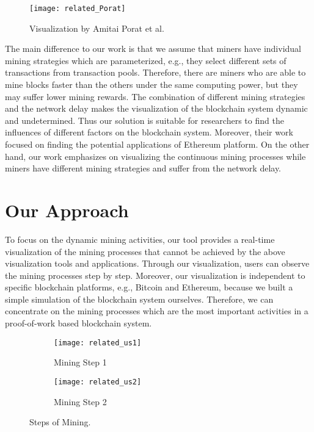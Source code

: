 \begin{figure}[htb]
    \centering
    \texttt{[image: related\_Porat]}
    \caption{Visualization by Amitai Porat et al.}
    \label{fig:visualization by amitai porat et al}
\end{figure}

The main difference to our work is that we assume that miners have individual mining strategies which are parameterized, e.g., they select different sets of transactions from transaction pools. Therefore, there are miners who are able to mine blocks faster than the others under the same computing power, but they may suffer lower mining rewards. The combination of different mining strategies and the network delay makes the visualization of the blockchain system dynamic and undetermined. Thus our solution is suitable for researchers to find the influences of different factors on the blockchain system. Moreover, their work focused on finding the potential applications of Ethereum platform. On the other hand, our work emphasizes on visualizing the continuous mining processes while miners have different mining strategies and suffer from the network delay. 

\section{Our Approach}

To focus on the dynamic mining activities, our tool provides a real-time visualization of the mining processes that cannot be achieved by the above visualization tools and applications. Through our visualization, users can observe the mining processes step by step. Moreover, our visualization is independent to specific blockchain platforms, e.g., Bitcoin and Ethereum, because we built a simple simulation of the blockchain system ourselves. Therefore, we can concentrate on the mining processes which are the most important activities in a proof-of-work based blockchain system.

\begin{figure}[htb]
    \centering
    \begin{subfigure}[b]{1\textwidth}
        \centering
        \texttt{[image: related\_us1]}
        \caption{Mining Step 1}
    \end{subfigure}

    \begin{subfigure}[b]{1\textwidth}
        \centering
        \texttt{[image: related\_us2]}
        \caption{Mining Step 2}
    \end{subfigure}

    \caption{Steps of Mining.}
    \label{fig:steps of mining}
\end{figure}

